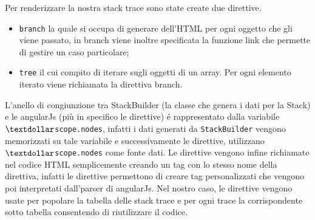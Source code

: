 Per renderizzare la nostra stack trace sono state create due direttive. 
\begin{itemize} 
	\item \texttt{branch} la quale si occupa di generare dell'HTML per ogni oggetto che gli viene passato, 
	in branch viene inoltre specificata la funzione link che permette di gestire un caso particolare;
	\item \texttt{tree} il cui compito di iterare sugli oggetti di un array. Per ogni elemento iterato viene richiamata 
	la direttiva branch. 
\end{itemize} 

L'anello di congiunzione tra StackBuilder (la classe che genera i dati per la Stack) e le angularJs (più in specifico le direttive) é rappresentato dalla variabile \texttt{$\textdollar$scope.nodes}, infatti i dati generati da \texttt{StackBuilder} vengono memorizzati su tale variabile e successivamente le direttive, utilizzano \texttt{$\textdollar$scope.nodes} come fonte dati. Le direttive vengono infine richiamate nel codice HTML semplicemente creando un 
tag con lo stesso nome della direttiva, infatti le direttive permettono di creare 
tag personalizzati che vengono poi interpretati dall'parser di angularJs. 
Nel nostro caso, le direttive vengono usate per popolare la tabella delle stack trace 
e per ogni trace la corrispondente sotto tabella consentendo di riutilizzare il codice.